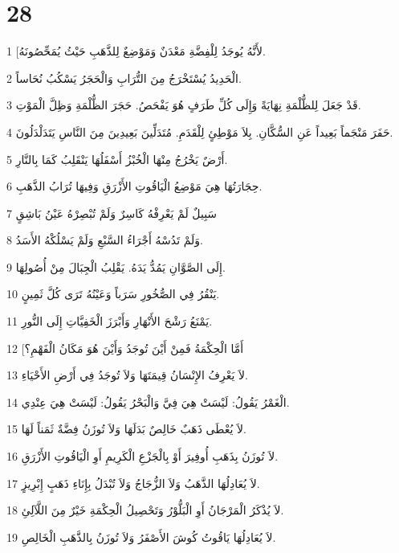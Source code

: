 \chapter{28}

\par 1 [لأَنَّهُ يُوجَدُ لِلْفِضَّةِ مَعْدَنٌ وَمَوْضِعٌ لِلذَّهَبِ حَيْثُ يُمَحِّصُونَهُ.
\par 2 الْحَدِيدُ يُسْتَخْرَجُ مِنَ التُّرَابِ وَالْحَجَرُ يَسْكُبُ نُحَاساً.
\par 3 قَدْ جَعَلَ لِلظُّلْمَةِ نِهَايَةً وَإِلَى كُلِّ طَرَفٍ هُوَ يَفْحَصُ. حَجَرَ الظُّلْمَةِ وَظِلَّ الْمَوْتِ.
\par 4 حَفَرَ مَنْجَماً بَعِيداً عَنِ السُّكَّانِ. بِلاَ مَوْطِئٍ لِلْقَدَمِ. مُتَدَلِّينَ بَعِيدِينَ مِنَ النَّاسِ يَتَدَلْدَلُونَ.
\par 5 أَرْضٌ يَخْرُجُ مِنْهَا الْخُبْزُ أَسْفَلُهَا يَنْقَلِبُ كَمَا بِالنَّارِ.
\par 6 حِجَارَتُهَا هِيَ مَوْضِعُ الْيَاقُوتِ الأَزْرَقِ وَفِيهَا تُرَابُ الذَّهَبِ.
\par 7 سَبِيلٌ لَمْ يَعْرِفْهُ كَاسِرٌ وَلَمْ تُبْصِرْهُ عَيْنُ بَاشِقٍ
\par 8 وَلَمْ تَدُسْهُ أَجْرَاءُ السَّبْعِ وَلَمْ يَسْلُكْهُ الأَسَدُ.
\par 9 إِلَى الصَّوَّانِ يَمُدُّ يَدَهُ. يَقْلِبُ الْجِبَالَ مِنْ أُصُولِهَا.
\par 10 يَنْقُرُ فِي الصُّخُورِ سَرَباً وَعَيْنُهُ تَرَى كُلَّ ثَمِينٍ.
\par 11 يَمْنَعُ رَشْحَ الأَنْهَارِ وَأَبْرَزَ الْخَفِيَّاتِ إِلَى النُّورِ.
\par 12 [أَمَّا الْحِكْمَةُ فَمِنْ أَيْنَ تُوجَدُ وَأَيْنَ هُوَ مَكَانُ الْفَهْمِ؟
\par 13 لاَ يَعْرِفُ الإِنْسَانُ قِيمَتَهَا وَلاَ تُوجَدُ فِي أَرْضِ الأَحْيَاءِ.
\par 14 الْغَمْرُ يَقُولُ: لَيْسَتْ هِيَ فِيَّ وَالْبَحْرُ يَقُولُ: لَيْسَتْ هِيَ عِنْدِي.
\par 15 لاَ يُعْطَى ذَهَبٌ خَالِصٌ بَدَلَهَا وَلاَ تُوزَنُ فِضَّةٌ ثَمَناً لَهَا.
\par 16 لاَ تُوزَنُ بِذَهَبِ أُوفِيرَ أَوْ بِالْجَزْعِ الْكَرِيمِ أَوِ الْيَاقُوتِ الأَزْرَقِ.
\par 17 لاَ يُعَادِلُهَا الذَّهَبُ وَلاَ الزُّجَاجُ وَلاَ تُبْدَلُ بِإِنَاءِ ذَهَبٍ إِبْرِيزٍ.
\par 18 لاَ يُذْكَرُ الْمَرْجَانُ أَوِ الْبَلُّوْرُ وَتَحْصِيلُ الْحِكْمَةِ خَيْرٌ مِنَ اللَّآلِئِ.
\par 19 لاَ يُعَادِلُهَا يَاقُوتُ كُوشَ الأَصْفَرُ وَلاَ تُوزَنُ بِالذَّهَبِ الْخَالِصِ.
